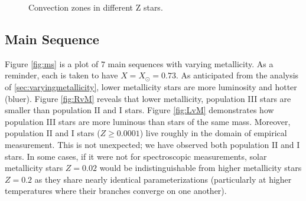 \documentclass[11pt]{article}
\begin{document}
\begin{center}
\begin{figure}[H]
\begin{subfigure}{.5\textwidth}
            \end{subfigure}
            \caption{Convection zones in different Z stars.}
            \label{fig:convectivecomparisonZ}
        \end{figure}
    \end{center}
    \subsection{Main Sequence}
    \label{sec:mainseq}
    Figure \ref{fig:ms} is a plot of $7$ main sequences with varying metallicity. As a reminder, each is taken to have $X = X_\odot = 0.73$. As anticipated from the analysis of \eqref{sec:varyingmetallicity}, lower metallicity stars are more luminosity and hotter (bluer). Figure \ref{fig:RvM} reveals that lower metallicity, population III stars are smaller than population II and I stars. Figure \ref{fig:LvM} demonstrates how population III stars are more luminous than stars of the same mass. Moreover, population II and I stars ($Z \geq 0.0001$) live roughly in the domain of empirical measurement. This is not unexpected; we have observed both population II and I stars. In some cases, if it were not for spectroscopic measurements, solar metallicity stars $Z = 0.02$ would be indistinguishable from higher metallicity stars $Z = 0.2$ as they share nearly identical parameterizations (particularly at higher temperatures where their branches converge on one another). \\
\end{document}
